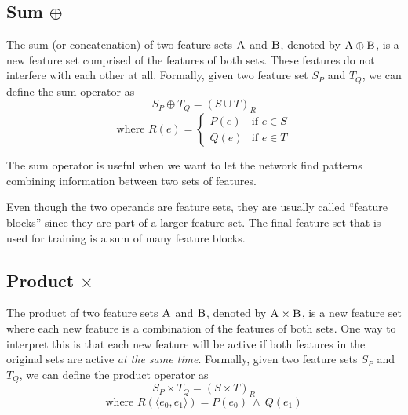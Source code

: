 \subsection{Sum $\oplus$}


The sum (or concatenation) of two feature sets $\textsc{A}$ and $\textsc{B}$, denoted by $\textsc{A} \oplus \textsc{B}$, is a new feature set comprised of the features of both sets. These features do not interfere with each other at all. Formally, given two feature set $S_P$ and $T_Q$, we can define the sum operator as
\begin{equation*}
S_P \oplus T_Q = {(S \cup T)}_R
\end{equation*}
\begin{equation*}
    \text{where } R(e) = \begin{cases}
        P(e) & \text{if } e \in S \\
        Q(e) & \text{if } e \in T
    \end{cases}
\end{equation*}

The sum operator is useful when we want to let the network find patterns combining information between two sets of features.

Even though the two operands are feature sets, they are usually called \enquote{feature blocks} since they are part of a larger feature set. The final feature set that is used for training is a sum of many feature blocks.

\subsection{Product $\times$}

The product of two feature sets $\textsc{A}$ and $\textsc{B}$, denoted by $\textsc{A} \times \textsc{B}$, is a new feature set where each new feature is a combination of the features of both sets. One way to interpret this is that each new feature will be active if both features in the original sets are active \textit{at the same time}. Formally, given two feature sets $S_P$ and $T_Q$, we can define the product operator as
\begin{equation*}
S_P \times T_Q = {(S \times T)}_{R}
\end{equation*}
\begin{equation*}
\text{where } R(\langle e_0, e_1 \rangle) = P(e_0)\ \land\ Q(e_1)
\end{equation*}

